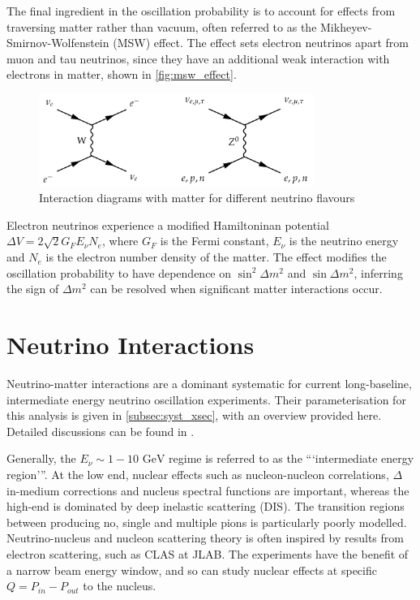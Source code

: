 The final ingredient in the oscillation probability is to account for effects from traversing matter rather than vacuum, often referred to as the Mikheyev-Smirnov-Wolfenstein (MSW) effect\cite{barger,parke,wolfenstein,msw}. The effect sets electron neutrinos apart from muon and tau neutrinos, since they have an additional weak interaction with electrons in matter, shown in \autoref{fig:msw_effect}.
\begin{figure}[h]
	\includegraphics[width=0.8\textwidth, trim={0mm 0mm 0mm 0mm}, clip,page=1]{figures/theory/msw_effect}
	\caption{Interaction diagrams with matter for different neutrino flavours}
	\label{fig:msw_effect}
\end{figure}

Electron neutrinos experience a modified Hamiltoninan potential $\Delta V = 2\sqrt{2}G_F E_\nu N_e$, where $G_F$ is the Fermi constant, $E_\nu$ is the neutrino energy and $N_e$ is the electron number density of the matter. The effect modifies the oscillation probability to have dependence on $\sin^2 \Delta m^2$ and $\sin \Delta m^2$, inferring the sign of $\Delta m^2$ can be resolved when significant matter interactions occur\cite{msw_summary}.

\section{Neutrino Interactions}
\label{sec:theory:int}
Neutrino-matter interactions are a dominant systematic for current long-baseline, intermediate energy neutrino oscillation experiments. Their parameterisation for this analysis is given in \autoref{subsec:syst_xsec}, with an overview provided here. Detailed discussions can be found in \cite{katori_martini,ulrich_review,nieves_review}.

Generally, the $E_\nu \sim 1-10\text{ GeV}$ regime is referred to as the ```intermediate energy region'''. At the low end, nuclear effects such as nucleon-nucleon correlations\cite{nieves1,nieves2}, $\Delta$ in-medium corrections\cite{nuclear_effects_1pi} and nucleus spectral functions \cite{benhar} are important, whereas the high-end is dominated by deep inelastic scattering (DIS). The transition regions between producing no, single and multiple pions is particularly poorly modelled. Neutrino-nucleus and nucleon scattering theory is often inspired by results from electron scattering\cite{joanna}, such as CLAS\cite{clas} at JLAB. The experiments have the benefit of a narrow beam energy window, and so can study nuclear effects at specific $Q=P_{in}-P_{out}$ to the nucleus. 

